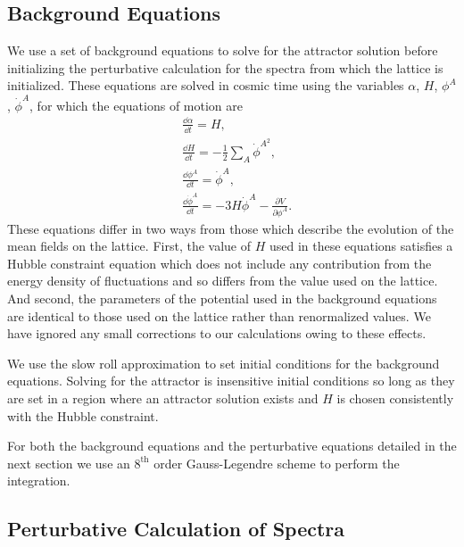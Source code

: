 

\subsection{Background Equations}
We use a set of background equations to solve for the attractor solution before initializing the perturbative calculation for the spectra from which the lattice is initialized. These equations are solved in cosmic time using the variables $\alpha$, $H$, $\phi^A$, $\dot{\phi}^A$, for which the equations of motion are
\begin{align}
  & \frac{\dd\alpha}{\dd t} = H, \\
  & \frac{\dd H}{\dd t} = -\frac{1}{2}\sum_A\dot{\phi}^{A^2}, \\
  & \frac{\dd\phi^A}{\dd t} = \dot{\phi}^A, \\
  & \frac{\dd\dot{\phi}^A}{\dd t} = -3H\dot{\phi}^A - \frac{\partial V}{\partial\phi^A}.
\end{align}
These equations differ in two ways from those which describe the evolution of the mean fields on the lattice. First, the value of $H$ used in these equations satisfies a Hubble constraint equation which does not include any contribution from the energy density of fluctuations and so differs from the value used on the lattice. And second, the parameters of the potential used in the background equations are identical to those used on the lattice rather than renormalized values. We have ignored any small corrections to our calculations owing to these effects.

We use the slow roll approximation to set initial conditions for the background equations. Solving for the attractor is insensitive initial conditions so long as they are set in a region where an attractor solution exists and $H$ is chosen consistently with the Hubble constraint. 

For both the background equations and the perturbative equations detailed in the next section we use an $8^\mathrm{th}$ order Gauss-Legendre scheme to perform the integration.

\subsection{Perturbative Calculation of Spectra}

